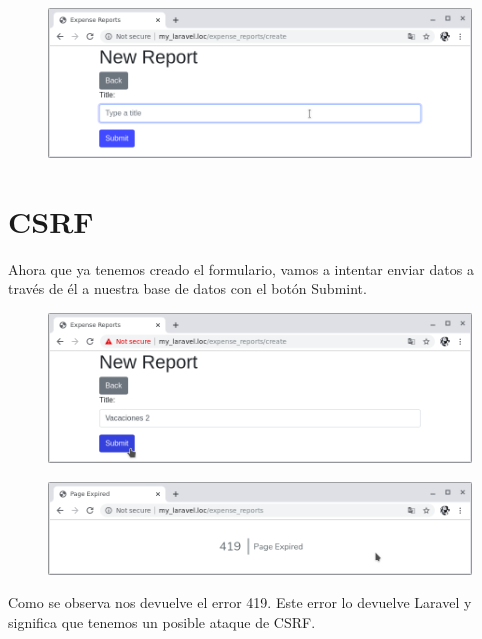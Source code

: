 \documentclass{article}
\begin{document}
\newpage

\begin{figure}[h!]
  \centering
  \includegraphics[scale=0.6]{./Pictures/058_formulario.png}
\end{figure}

\newpage


\section{CSRF}%
Ahora que ya tenemos creado el formulario, vamos a intentar enviar datos a
través de él a nuestra base de datos con el botón Submint.\\

\begin{figure}[h!]
  \centering
  \includegraphics[scale=0.5]{./Pictures/059_enviando_form.png}
\end{figure}

\begin{figure}[h!]
  \centering
  \includegraphics[scale=0.5]{./Pictures/060_error_419.png}
\end{figure}

Como se observa nos devuelve el error 419. Este error lo devuelve Laravel y
significa que tenemos un posible ataque de CSRF.\\
\end{document}
